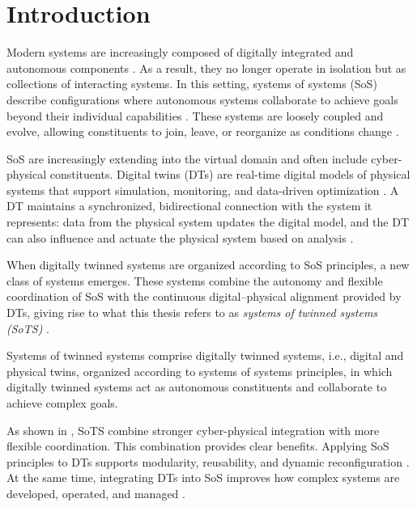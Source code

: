 \chapter{Introduction}\label{ch:introduction}
Modern systems are increasingly composed of digitally integrated and autonomous components \citep{incose2035}. As a result, they no longer operate in isolation but as collections of interacting systems. In this setting, systems of systems (SoS) describe configurations where autonomous systems collaborate to achieve goals beyond their individual capabilities \citep{maier1998architecting}. These systems are loosely coupled and evolve, allowing constituents to join, leave, or reorganize as conditions change \citep{nielsen2015systems}. 

SoS are increasingly extending into the virtual domain and often include cyber-physical constituents. Digital twins (DTs) are real-time digital models of physical systems that support simulation, monitoring, and data-driven optimization \cite{david2024infonomics}. A DT maintains a synchronized, bidirectional connection with the system it represents: data from the physical system updates the digital model, and the DT can also influence and actuate the physical system based on analysis \citep{kritzinger2018digital}.

When digitally twinned systems are organized according to SoS principles, a new class of systems emerges. These systems combine the autonomy and flexible coordination of SoS with the continuous digital--physical alignment provided by DTs, giving rise to what this thesis refers to as \emph{systems of twinned systems (SoTS)} \cite{adesanya2025systems}.

\begin{definitionframe}
Systems of twinned systems comprise digitally twinned systems, i.e., digital and physical twins, organized according to systems of systems principles, in which digitally twinned systems act as autonomous constituents and collaborate to achieve complex goals.
\end{definitionframe}

As shown in , SoTS combine stronger cyber-physical integration with more flexible coordination. This combination provides clear benefits. Applying SoS principles to DTs supports modularity, reusability, and dynamic reconfiguration \cite{dietz2020digital}. At the same time, integrating DTs into SoS improves how complex systems are developed, operated, and managed \cite{gill2024automating}.

